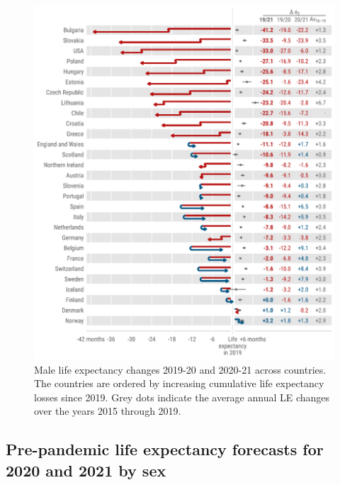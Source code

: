 \documentclass[12pt]{article}
\begin{document}
\begin{figure}[hb!]
    \centering
    \includegraphics{50-e0diffM.pdf}
    \caption{Male life expectancy changes 2019-20 and 2020-21 across countries. The countries are ordered by increasing cumulative life expectancy losses since 2019. Grey dots indicate the average annual LE changes over the years 2015 through 2019.}
    \label{fig:de0M}
\end{figure}

\clearpage

\subsection*{Pre-pandemic life expectancy forecasts for 2020 and 2021 by sex}
\end{document}
